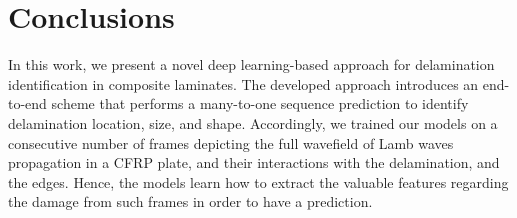 \documentclass{IOS-Book-Article}
\begin{document}
\section{Conclusions}
	In this work, we present a novel deep learning-based approach for delamination identification in composite laminates.
	The developed approach introduces an end-to-end scheme that performs a many-to-one sequence prediction to identify delamination location, size, and shape.
	Accordingly, we trained our models on a consecutive number of frames depicting the full wavefield of Lamb waves propagation in a CFRP plate, and their interactions with the delamination, and the edges.
	Hence, the models learn how to extract the valuable features regarding the damage from such frames in order to have a prediction.

%	
%	
%	
%	
%	
%	
%	
%	
\end{document}
